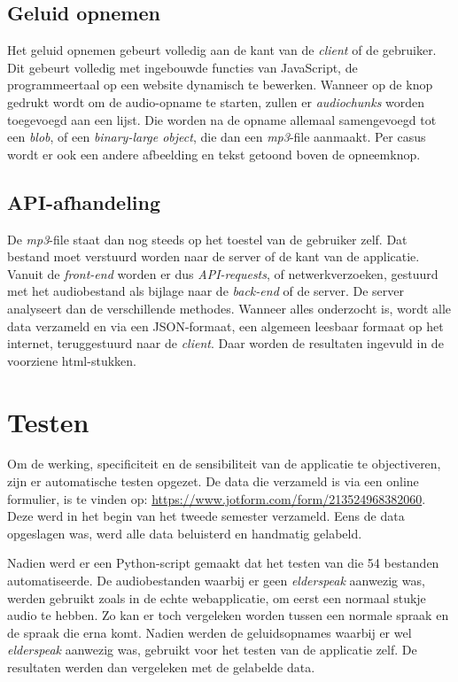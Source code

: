 \subsection{Geluid opnemen}
Het geluid opnemen gebeurt volledig aan de kant van de \textit{client} of de gebruiker. Dit gebeurt volledig met ingebouwde functies van JavaScript, de programmeertaal op een website dynamisch te bewerken. Wanneer op de knop gedrukt wordt om de audio-opname te starten, zullen er \textit{audiochunks } worden toegevoegd aan een lijst. Die worden na de opname allemaal samengevoegd tot een \textit{blob}, of een \textit{binary-large object}, die dan een \textit{mp3}-file aanmaakt.
Per casus wordt er ook een andere afbeelding en tekst getoond boven de opneemknop.

\subsection{API-afhandeling}
De \textit{mp3}-file staat dan nog steeds op het toestel van de gebruiker zelf. Dat bestand moet verstuurd worden naar de server of de  kant van de applicatie.
Vanuit de \textit{front-end} worden er dus \textit{API-requests}, of netwerkverzoeken, gestuurd met het audiobestand als bijlage naar de \textit{back-end} of de server. De server analyseert dan de verschillende methodes. Wanneer alles onderzocht is, wordt alle data verzameld en via een JSON-formaat, een algemeen leesbaar formaat op het internet, teruggestuurd naar de \textit{client}. Daar worden de resultaten ingevuld in de voorziene html-stukken.

\section{Testen}
Om de werking, specificiteit en de sensibiliteit van de applicatie te objectiveren, zijn er automatische testen opgezet. De data die verzameld is via een online formulier, is te vinden op:  \url{https://www.jotform.com/form/213524968382060}. Deze werd in het begin van het tweede semester verzameld. Eens de data opgeslagen was, werd alle data beluisterd en handmatig gelabeld.

Nadien werd er een Python-script gemaakt dat het testen van die 54 bestanden automatiseerde. De audiobestanden waarbij er geen \textit{elderspeak} aanwezig was, werden gebruikt zoals in de echte webapplicatie, om eerst een normaal stukje audio te hebben. Zo kan er toch vergeleken worden tussen een normale spraak en de spraak die erna komt. Nadien werden de geluidsopnames waarbij er wel \textit{elderspeak} aanwezig was, gebruikt voor het testen van de applicatie zelf. De resultaten werden dan vergeleken met de gelabelde data.

